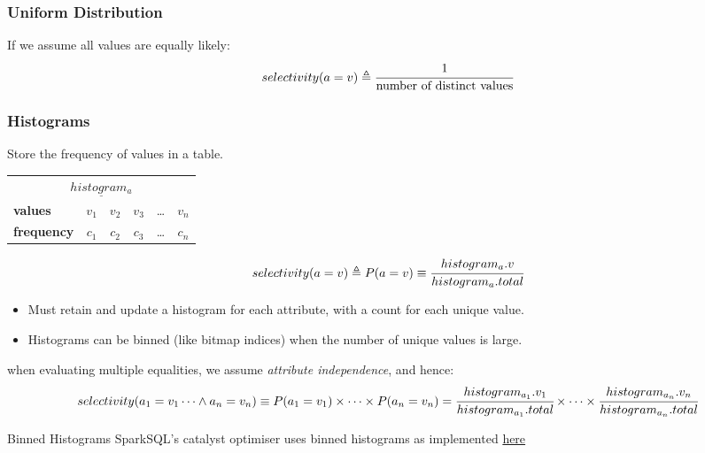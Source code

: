 \subsubsection{Uniform Distribution}
If we assume all values are equally likely:
\[selectivity(a = v) \triangleq \cfrac{1}{\text{number of distinct values}}\]


\subsubsection{Histograms}
Store the frequency of values in a table.
\begin{center}
    \begin{minipage}{.49\textwidth}
        \begin{center}
            \begin{tabular}{l c c c c c}
                \multicolumn{6}{c}{$\underline{histogram_a}$}              \\
                \textbf{values}    & $v_1$ & $v_2$ & $v_3$ & \dots & $v_n$ \\
                \textbf{frequency} & $c_1$ & $c_2$ & $c_3$ & \dots & $c_n$ \\
            \end{tabular}
        \end{center}
    \end{minipage} \hfill \begin{minipage}{.49\textwidth}
        \[selectivity(a = v) \triangleq P(a = v) \equiv \cfrac{histogram_a.v}{histogram_a.total} \]
    \end{minipage}
\end{center}
\begin{itemize}
    \item Must retain and update a histogram for each attribute, with a count for each unique value.
    \item Histograms can be binned (like bitmap indices) when the number of unique values is large.
\end{itemize}
when evaluating multiple equalities, we assume \textit{attribute independence}, and hence:
\[selectivity(a_1 = v_1  \dots \land a_n = v_n) \equiv P(a_1 = v_1) \times \dots \times P(a_n = v_n) = \cfrac{histogram_{a_1}.v_1}{histogram_{a_1}.total} \times \dots \times \cfrac{histogram_{a_n}.v_n}{histogram_{a_n}.total}\]

\begin{sidenotebox}{Binned Histograms}
    SparkSQL's catalyst optimiser uses binned histograms as implemented \href{https://github.com/apache/spark/blob/master/sql/catalyst/src/main/scala/org/apache/spark/sql/catalyst/plans/logical/Statistics.scala}{here}
\end{sidenotebox}

